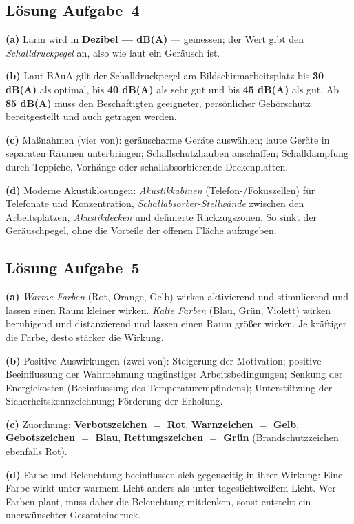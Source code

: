 \documentclass[11pt, a4paper]{article}
\begin{document}
\subsection*{Lösung Aufgabe~4}
\begin{loesung}
\textbf{(a)} Lärm wird in \textbf{Dezibel --- dB(A)} --- gemessen; der Wert gibt den
\emph{Schalldruckpegel} an, also wie laut ein Geräusch ist.

\textbf{(b)} Laut BAuA gilt der Schalldruckpegel am Bildschirmarbeitsplatz bis
\textbf{30 dB(A)} als optimal, bis \textbf{40 dB(A)} als sehr gut und bis
\textbf{45 dB(A)} als gut. Ab \textbf{85 dB(A)} muss den Beschäftigten geeigneter,
persönlicher Gehörschutz bereitgestellt und auch getragen werden.

\textbf{(c)} Maßnahmen (vier von): geräuscharme Geräte auswählen; laute Geräte in
separaten Räumen unterbringen; Schallschutzhauben anschaffen; Schalldämpfung durch
Teppiche, Vorhänge oder schallabsorbierende Deckenplatten.

\textbf{(d)} Moderne Akustiklösungen: \emph{Akustikkabinen} (Telefon-/Fokuszellen) für
Telefonate und Konzentration, \emph{Schallabsorber-Stellwände} zwischen den
Arbeitsplätzen, \emph{Akustikdecken} und definierte Rückzugszonen. So sinkt der
Geräuschpegel, ohne die Vorteile der offenen Fläche aufzugeben.
\end{loesung}

\subsection*{Lösung Aufgabe~5}
\begin{loesung}
\textbf{(a)} \emph{Warme Farben} (Rot, Orange, Gelb) wirken aktivierend und stimulierend
und lassen einen Raum kleiner wirken. \emph{Kalte Farben} (Blau, Grün, Violett) wirken
beruhigend und distanzierend und lassen einen Raum größer wirken. Je kräftiger die Farbe,
desto stärker die Wirkung.

\textbf{(b)} Positive Auswirkungen (zwei von): Steigerung der Motivation; positive
Beeinflussung der Wahrnehmung ungünstiger Arbeitsbedingungen; Senkung der Energiekosten
(Beeinflussung des Temperaturempfindens); Unterstützung der Sicherheitskennzeichnung;
Förderung der Erholung.

\textbf{(c)} Zuordnung: \textbf{Verbotszeichen $=$ Rot}, \textbf{Warnzeichen $=$ Gelb},
\textbf{Gebotszeichen $=$ Blau}, \textbf{Rettungszeichen $=$ Grün} (Brandschutzzeichen
ebenfalls Rot).

\textbf{(d)} Farbe und Beleuchtung beeinflussen sich gegenseitig in ihrer Wirkung: Eine
Farbe wirkt unter warmem Licht anders als unter tageslichtweißem Licht. Wer Farben plant,
muss daher die Beleuchtung mitdenken, sonst entsteht ein unerwünschter Gesamteindruck.
\end{loesung}
\end{document}
